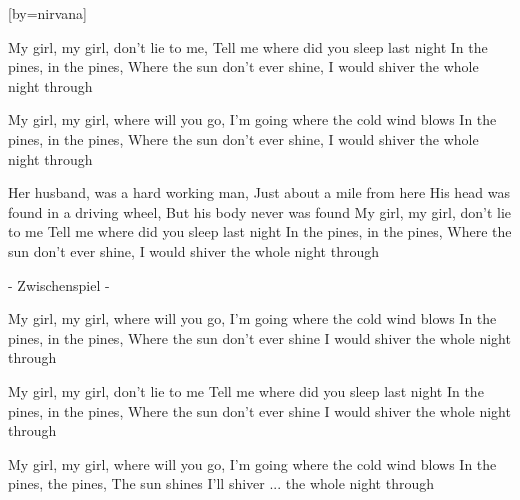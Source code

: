 

[by=nirvana]




\beginverse
My girl, my girl, don't lie to me, Tell me where did you sleep last night
In the pines, in the pines, Where the sun don't ever shine,
I would shiver the whole night through
\endverse

\beginverse
My girl, my girl, where will you go, I'm going where the cold wind blows
In the pines, in the pines, Where the sun don't ever shine,
I would shiver the whole night through
\endverse

\beginverse
Her husband, was a hard working man, Just about a mile from here
His head was found in a driving wheel, But his body never was found
My girl, my girl, don't lie to me
Tell me where did you sleep last night
In the pines, in the pines, Where the sun don't ever shine,
I would shiver the whole night through
\endverse

\beginverse
- Zwischenspiel -
\endverse

\beginverse
My girl, my girl, where will you go, I'm going where the cold wind blows
In the pines, in the pines, Where the sun don't ever shine
I would shiver the whole night through
\endverse

\beginverse
My girl, my girl, don't lie to me
Tell me where did you sleep last night
In the pines, in the pines, Where the sun don't ever shine
I would shiver the whole night through
\endverse

\beginverse
My girl, my girl, where will you go, I'm going where the cold wind blows
In the pines, the pines, The sun shines
I'll shiver ... the whole night through
\endverse

\endsong
